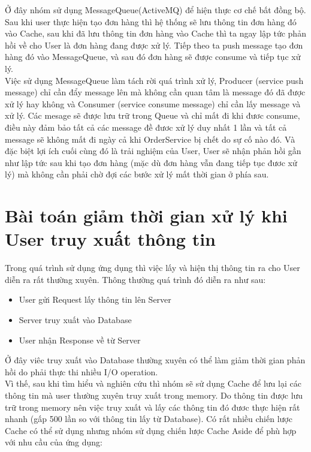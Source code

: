         Ở đây nhóm sử dụng MessageQueue(ActiveMQ) để hiện thực cơ chế bất đồng bộ. Sau khi user thực hiện tạo đơn hàng thì hệ thống sẽ lưu thông tin đơn hàng đó vào Cache, sau khi đã lưu thông tin đơn hàng vào Cache thì ta ngay lập tức phản hồi về cho User là đơn hàng đang được xử lý. Tiếp theo ta push message tạo đơn hàng đó vào MessageQueue, và sau đó đơn hàng sẽ được consume và tiếp tục xử lý.\\
        Việc sử dụng MessageQueue làm tách rời quá trình xử lý, Producer (service push message) chỉ cần đẩy message lên mà không cần quan tâm là message đó đã được xử lý hay không và Consumer (service consume message) chỉ cần lấy message và xử lý. Các mesage sẽ được lưu trữ trong Queue và chỉ mất đi khi đươc consume, điều này đảm bảo tất cả các message đề đươc xử lý duy nhất 1 lần và tất cả message sẽ không mất đi ngày cả khi OrderService bị chết do sự cố nào đó. Và đặc biệt lợi ích cuối cùng đó là trải nghiệm của User, User sẽ nhận phản hồi gần như lập tức sau khi tạo đơn hàng (mặc dù đơn hàng vẫn đang tiếp tục đươc xử lý) mà không cần phải chờ đợi các bước xử lý mất thời gian ở phía sau. 
	
		\section{Bài toán giảm thời gian xử lý khi User truy xuất thông tin}
		    Trong quá trình sử dụng ứng dụng thì việc lấy và hiện thị thông tin ra cho User diễn ra rất thường xuyên. Thông thường quá trình đó diễn ra như sau:
		    \begin{itemize}
                \item User gửi Request lấy thông tin lên Server
                \item Server truy xuất vào Database
                \item User nhận Response về từ Server 
            \end{itemize}
            
            
            Ở đây viêc truy xuất vào Database thường xuyên có thể làm giảm thời gian phản hồi do phải thực thi nhiều I/O operation. \\
            Vì thế, sau khi tìm hiểu và nghiên cứu thì nhóm sẽ sử dụng Cache để lưu lại các thông tin mà user thường xuyên truy xuất trong memory. Do thông tin được lưu trữ trong memory nên việc truy xuất và lấy các thông tin đó đươc thực hiện rất nhanh (gấp 500 lần so với thông tin lấy từ Database). Có rất nhiều chiến lược Cache có thể sử dụng nhưng nhóm sử dụng chiến lược Cache Aside để phù hợp với nhu cầu của ứng dụng:
            
